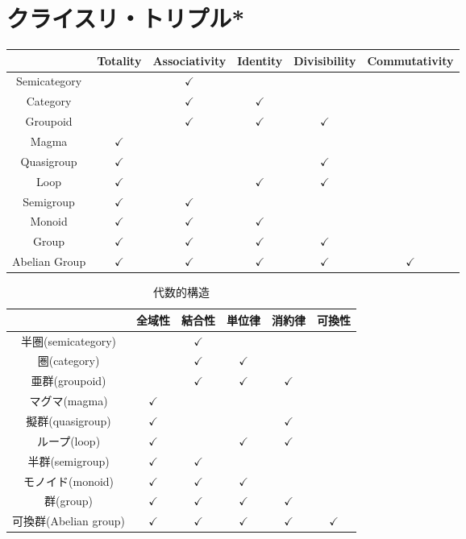 \documentclass[a5paper,draft]{jsbook}
\begin{document}
\section{クライスリ・トリプル*}

\begin{table*}
\begin{center}
\begin{tabular}{||c||c|c|c|c|c||}
\hline
&Totality&Associativity&Identity&Divisibility&Commutativity\\
\hline\hline
Semicategory&&$\checkmark$&&&\\
Category&&$\checkmark$&$\checkmark$&&\\
Groupoid&&$\checkmark$&$\checkmark$&$\checkmark$&\\
Magma&$\checkmark$&&&&\\
Quasigroup&$\checkmark$&&&$\checkmark$&\\
Loop&$\checkmark$&&$\checkmark$&$\checkmark$&\\
Semigroup&$\checkmark$&$\checkmark$&&&\\
Monoid&$\checkmark$&$\checkmark$&$\checkmark$&&\\
Group&$\checkmark$&$\checkmark$&$\checkmark$&$\checkmark$&\\
Abelian Group&$\checkmark$&$\checkmark$&$\checkmark$&$\checkmark$&$\checkmark$\\
\hline
\end{tabular}
\end{center}
\end{table*}

\begin{table*}
\caption{代数的構造}
\label{tab:algebraicstrcture}
\begin{center}
\begin{tabular}{||c||c|c|c|c|c||}
\hline
&全域性&結合性&単位律&消約律&可換性\\
\hline\hline
半圏(semicategory)&&$\checkmark$&&&\\
圏(category)&&$\checkmark$&$\checkmark$&&\\
亜群(groupoid)&&$\checkmark$&$\checkmark$&$\checkmark$&\\
マグマ(magma)&$\checkmark$&&&&\\
擬群(quasigroup)&$\checkmark$&&&$\checkmark$&\\
ループ(loop)&$\checkmark$&&$\checkmark$&$\checkmark$&\\
半群(semigroup)&$\checkmark$&$\checkmark$&&&\\
モノイド(monoid)&$\checkmark$&$\checkmark$&$\checkmark$&&\\
群(group)&$\checkmark$&$\checkmark$&$\checkmark$&$\checkmark$&\\
可換群(Abelian group)&$\checkmark$&$\checkmark$&$\checkmark$&$\checkmark$&$\checkmark$\\
\hline
\end{tabular}
\end{center}
\end{table*}
\end{document}
